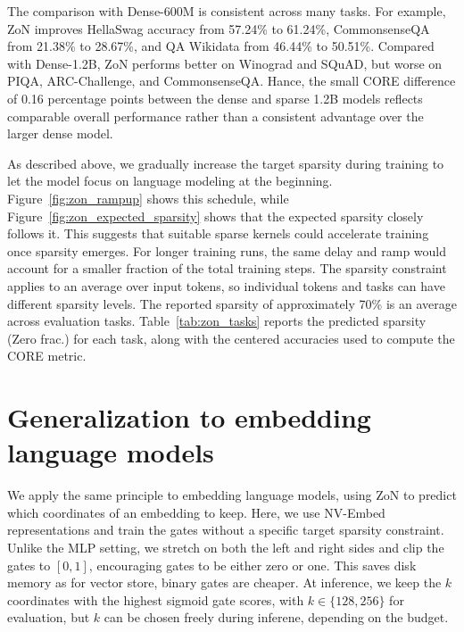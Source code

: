 \documentclass{article} %
\begin{document}
The comparison with Dense-600M is consistent across many tasks. For example,
ZoN improves HellaSwag accuracy from 57.24\% to 61.24\%, CommonsenseQA from
21.38\% to 28.67\%, and QA Wikidata from 46.44\% to 50.51\%.
Compared with Dense-1.2B, ZoN performs better on
Winograd and SQuAD, but worse on PIQA, ARC-Challenge, and CommonsenseQA.
Hance, the small CORE difference of 0.16 percentage points between the dense and sparse
1.2B models reflects comparable overall performance rather than a 
consistent advantage over the larger dense model.

As described above, we gradually increase the target sparsity during training
to let the model focus on language modeling at the beginning.
Figure~\ref{fig:zon_rampup} shows this schedule, while
Figure~\ref{fig:zon_expected_sparsity} shows that the expected sparsity closely
follows it. This suggests that suitable sparse kernels could accelerate
training once sparsity emerges. For longer training runs, the same delay and
ramp would account for a smaller fraction of the total training steps.
The sparsity constraint applies to an average over input tokens, so individual
tokens and tasks can have different sparsity levels.
The reported sparsity of approximately 70\% is an average across evaluation tasks.
Table~\ref{tab:zon_tasks} reports the predicted sparsity (Zero frac.) for each
task, along with the centered accuracies used to compute the CORE metric.


\section{Generalization to embedding language models}
\label{sec:embedding_models}

We apply the same principle to embedding language models, using ZoN to predict
which coordinates of an embedding to keep. Here, we use NV-Embed representations
and train the gates without a specific target sparsity constraint. Unlike the MLP setting, we
stretch on both the left and right sides and clip the gates to $[0,1]$, encouraging
gates to be either zero or one. This saves disk memory as for vector store, binary
gates are cheaper. At inference, we keep the $k$ coordinates with
the highest sigmoid gate scores, with $k\in\{128,256\}$ for evaluation,
but $k$ can be chosen freely during inferene, depending on the budget. 
\end{document}
